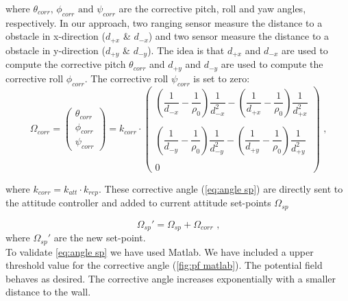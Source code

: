 where $\theta_{corr} \text{, } \phi_{corr} \text{ and } \psi_{corr}$ are the corrective pitch, roll and yaw angles, respectively. In our approach, two ranging sensor measure the distance to a obstacle in x-direction  ($d_{+x}$ \& $d_{-x}$) and two sensor measure the distance to a obstacle in y-direction ($d_{+y}$ \& $d_{-y}$). The idea is that $d_{+x}$ and $d_{-x}$ are used to compute the corrective pitch $\theta_{corr}$ and $d_{+y}$ and $d_{-y}$ are used to compute the corrective roll $\phi_{corr}$. The corrective roll $\psi_{corr}$ is set to zero:
\begin{equation}
	\label{eq:angle sp}
	\Omega_{corr} =
	\begin{pmatrix}
	\theta_{corr} \\ \phi_{corr} \\ \psi_{corr}
	\end{pmatrix} =
	k_{corr}\cdot 
	\begin{pmatrix}
	\left(\dfrac{1}{d_{-x}}-\dfrac{1}{\rho_0}\right)\dfrac{1}{d_{-x}^2}-\left(\dfrac{1}{d_{+x}}-\dfrac{1}{\rho_0}\right)\dfrac{1}{d_{+x}^2}\\\\
	\left(\dfrac{1}{d_{-y}}-\dfrac{1}{\rho_0}\right)\dfrac{1}{d_{-y}^2}-\left(\dfrac{1}{d_{+y}}-\dfrac{1}{\rho_0}\right)\dfrac{1}{d_{+y}^2} \\\\
	0
	\end{pmatrix}
	\text{ ,}
\end{equation}

where $k_{corr}=k_{att}\cdot k_{rep}$. These corrective angle (\cref{eq:angle sp}) are directly sent to the attitude controller and added to current attitude set-points $\Omega_{sp}$

\begin{equation}
\label{eq:new sp}
	\Omega_{sp}' = \Omega_{sp} + \Omega_{corr} \text{ ,}
\end{equation}
where $\Omega_{sp}'$ are the new set-point. \\
To validate \cref{eq:angle sp} we have used Matlab. We have included a upper threshold value for the corrective angle (\cref{fig:pf matlab}). The potential field behaves as desired. The corrective angle increases exponentially with a smaller distance to the wall. 

